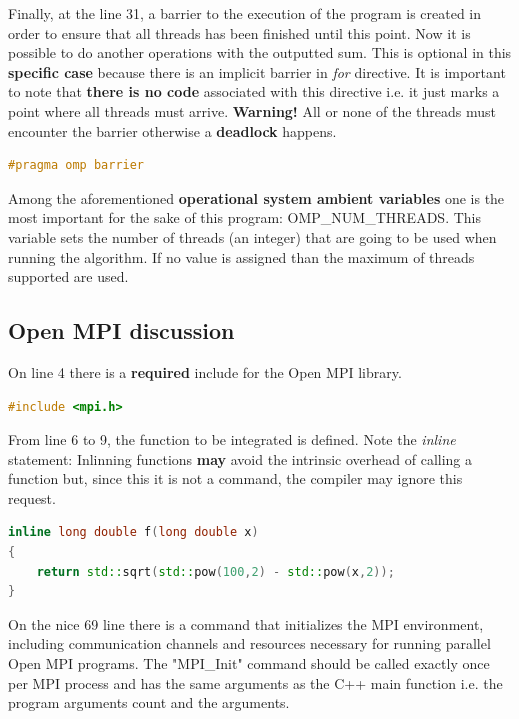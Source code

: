 		\par Finally, at the line 31, a barrier to the execution of the program is created in order to ensure that all threads has been finished until this point. Now it is possible to do another operations with the outputted sum.  This is optional in this \textbf{specific case} because there is an implicit barrier in \textit{for} directive. It is important to note that \textbf{there is no code} associated with this directive i.e. it just marks a point where all threads must arrive. \textbf{Warning!} All or none of the threads must encounter the barrier otherwise a \textbf{deadlock} happens.
		
		\begin{lstlisting}[language=C++]
#pragma omp barrier
		\end{lstlisting}
	
		\par Among the aforementioned \textbf{operational system ambient variables} one is the most important for the sake of this program: OMP\_NUM\_THREADS. This variable sets the number of threads (an integer) that are going to be used when running the algorithm. If no value is assigned than the maximum of threads supported are used.
		
		\subsection{Open MPI discussion}
		\par On line 4 there is a \textbf{required} include for the Open MPI library.
		\begin{lstlisting}[language=C++]
#include <mpi.h>
		\end{lstlisting}
	
		\par From line 6 to 9, the function to be integrated is defined. Note the \textit{inline} statement: Inlinning functions \textbf{may} avoid the intrinsic overhead of calling a function but, since this it is not a command, the compiler may ignore this request.
		
		\begin{lstlisting}[language=C++]
inline long double f(long double x)
{
	return std::sqrt(std::pow(100,2) - std::pow(x,2));
}
		\end{lstlisting}
	
	
		\par On the nice 69 line there is a command that initializes the MPI environment, including communication channels and resources necessary for running parallel Open MPI programs. The "MPI\_Init" command should be called exactly once per MPI process and has the same arguments as the C++ main function i.e. the program arguments count and the arguments.
		
